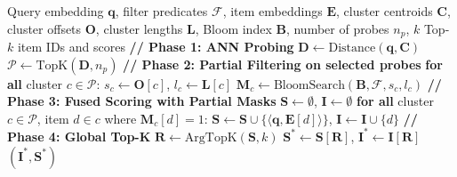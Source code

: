 \begin{algorithm}[t]
\caption{Co-designed ANN Search with Partial Bloom Filtering}
\label{alg:partial_bloom}
\begin{algorithmic}[1]
\Require Query embedding $\mathbf{q}$, filter predicates $\mathcal{F}$, item embeddings $\mathbf{E}$, cluster centroids $\mathbf{C}$, cluster offsets $\mathbf{O}$, cluster lengths $\mathbf{L}$, Bloom index $\mathbf{B}$, number of probes $n_p$, $k$
\Ensure Top-$k$ item IDs and scores
\State \textbf{// Phase 1: ANN Probing}
\State $\mathbf{D} \gets \mathrm{Distance}(\mathbf{q}, \mathbf{C})$
\State $\mathcal{P} \gets \mathrm{TopK}(\mathbf{D}, n_p)$
\State \textbf{// Phase 2: Partial Filtering on selected probes}
\State \textbf{for all} cluster $c \in \mathcal{P}$:
\State \quad $s_c \gets \mathbf{O}[c]$, $l_c \gets \mathbf{L}[c]$
\State \quad $\mathbf{M}_c \gets \mathrm{BloomSearch}(\mathbf{B}, \mathcal{F}, s_c, l_c)$
\State \textbf{// Phase 3: Fused Scoring with Partial Masks}
\State $\mathbf{S} \gets \emptyset$, $\mathbf{I} \gets \emptyset$ 
\State \textbf{for all} cluster $c \in \mathcal{P}$, item $d \in c$ where $\mathbf{M}_c[d] = 1$:
\State \quad $\mathbf{S} \gets \mathbf{S} \cup \{\langle \mathbf{q}, \mathbf{E}[d] \rangle\}$, $\mathbf{I} \gets \mathbf{I} \cup \{d\}$
\State \textbf{// Phase 4: Global Top-K}
\State $\mathbf{R} \gets \mathrm{ArgTopK}(\mathbf{S}, k)$
\State $\mathbf{S}^* \gets \mathbf{S}[\mathbf{R}]$, $\mathbf{I}^* \gets \mathbf{I}[\mathbf{R}]$
\State \Return $(\mathbf{I}^*, \mathbf{S}^*)$ 
\end{algorithmic}
\end{algorithm}